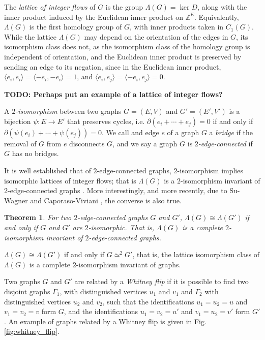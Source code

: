 \documentclass[12pt]{report}
\newcommand{\Z}{\mathbb{Z}}
\newcommand{\ip}[2]{\langle #1, #2 \rangle}
\newcommand{\notegreen}[1]{{\color{Green} \textbf{#1}}}
\newtheorem*{theorem}{Theorem}
\begin{document}
The \textit{lattice of integer flows} of $G$ is the group $\Lambda(G) = \ker D$, along with the inner product induced by the Euclidean inner product on $\Z^{E}$. Equivalently, $\Lambda(G)$ is the first homology group of $G$, with inner products taken in $C_{1}(G)$. While the lattice $\Lambda(G)$ may depend on the orientation of the edges in $G$, its isomorphism class does not, as the isomorphism class of the homology group is independent of orientation, and the Euclidean inner product is preserved by sending an edge to its negation, since in the Euclidean inner product, $\ip{e_{i}}{e_{i}} =  \ip{-e_{i}}{-e_{i}} = 1$, and $\ip{e_{i}}{e_{j}} = \ip{-e_{i}}{e_{j}} = 0$.

\notegreen{TODO: Perhaps put an example of a lattice of integer flows?}

A \textit{$2$-isomorphism} between two graphs $G = (E, V)$ and $G' = (E', V')$ is a bijection \({\psi: E \longrightarrow E'}\) that preserves cycles, i.e. $\partial(e_{i} + \cdots + e_{j}) = 0$ if and only if $\partial\left(\psi(e_{i}) + \cdots + \psi(e_{j})\right) = 0$. We call and edge $e$ of a graph $G$ a \textit{bridge} if the removal of $G$ from $e$ disconnects $G$, and we say a graph $G$ is \textit{$2$-edge-connected} if $G$ has no bridges.

It is well established that of $2$-edge-connected graphs, $2$-isomorphism implies isomorphic lattices of integer flows; that is $\Lambda(G)$ is a $2$-isomorphism invariant of $2$-edge-connected graphs \parencite{lattice-of-flows-cuts}. More interestingly, and more recently, due to Su-Wagner \cite[Theorem 1]{lattice-of-flows-regular-matroid} and Caporaso-Viviani \cite[Theorem 3.1.1]{torelli-for-graphs-tropical-curves}, the converse is also true.


\begin{theorem}
For two $2$-edge-connected graphs $G$ and $G'$, $\Lambda(G) \cong \Lambda(G')$ if and only if $G$ and $G'$ are $2$-isomorphic. That is, $\Lambda(G)$ is a complete $2$-isomorphism invariant of $2$-edge-connected graphs.
\end{theorem} $\Lambda(G) \cong \Lambda(G')$ if and only if $G \simeq^{2} G'$, that is, the lattice isomorphism class of $\Lambda(G)$ is a complete $2$-isomorphism invariant of graphs.

Two graphs $G$ and $G'$ are related by a \textit{Whitney flip} if it is possible to find two disjoint graphs $\Gamma_{1}$, with distinguished vertices $u_{1}$ and $v_{1}$ and $\Gamma_{2}$ with distinguished vertices $u_{2}$ and $v_{2}$, such that the identifications $u_{1} = u_{2} = u$ and $v_{1} = v_{2} = v$ form $G$, and the identifications $u_{1} = v_{2} = u'$ and $v_{1} = u_{2} = v'$ form $G'$. An example of graphs related by a Whitney flip is given in Fig. \ref{fig:whitney_flip}.
\end{document}

